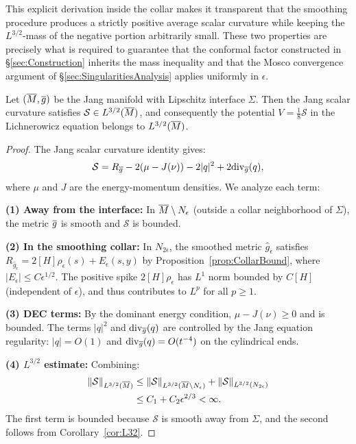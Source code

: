 This explicit derivation inside the collar makes it transparent that the smoothing procedure produces a strictly positive average scalar curvature while keeping the $L^{3/2}$-mass of the negative portion arbitrarily small.  These two properties are precisely what is required to guarantee that the conformal factor constructed in \S\ref{sec:Construction} inherits the mass inequality and that the Mosco convergence argument of \S\ref{sec:SingularitiesAnalysis} applies uniformly in $\epsilon$.

\begin{lemma}\label{lem:MiaoCorner}
Let $(\overline{M}, \overline{g})$ be the Jang manifold with Lipschitz interface $\Sigma$. Then the Jang scalar curvature satisfies $\mathcal{S} \in L^{3/2}(\overline{M})$, and consequently the potential $V = \frac{1}{8}\mathcal{S}$ in the Lichnerowicz equation belongs to $L^{3/2}(\overline{M})$.
\end{lemma}

\begin{proof}
The Jang scalar curvature identity gives:
\begin{equation}
    \mathcal{S} = R_{\overline{g}} - 2(\mu - J(\nu)) - 2|q|^2 + 2\mathrm{div}_{\overline{g}}(q),
\end{equation}
where $\mu$ and $J$ are the energy-momentum densities. We analyze each term:

\textbf{(1) Away from the interface:} In $\overline{M} \setminus N_\epsilon$ (outside a collar neighborhood of $\Sigma$), the metric $\overline{g}$ is smooth and $\mathcal{S}$ is bounded.

\textbf{(2) In the smoothing collar:} In $N_{2\epsilon}$, the smoothed metric $\hat{g}_\epsilon$ satisfies $R_{\hat{g}_\epsilon} = 2[H]\rho_\epsilon(s) + E_\epsilon(s,y)$ by Proposition~\ref{prop:CollarBound}, where $|E_\epsilon| \le C\epsilon^{1/2}$. The positive spike $2[H]\rho_\epsilon$ has $L^1$ norm bounded by $C[H]$ (independent of $\epsilon$), and thus contributes to $L^p$ for all $p \ge 1$.

\textbf{(3) DEC terms:} By the dominant energy condition, $\mu - J(\nu) \ge 0$ and is bounded. The terms $|q|^2$ and $\mathrm{div}_{\overline{g}}(q)$ are controlled by the Jang equation regularity: $|q| = O(1)$ and $\mathrm{div}_{\overline{g}}(q) = O(t^{-4})$ on the cylindrical ends.

\textbf{(4) $L^{3/2}$ estimate:} Combining:
\begin{align}
    \|\mathcal{S}\|_{L^{3/2}(\overline{M})} &\le \|\mathcal{S}\|_{L^{3/2}(\overline{M} \setminus N_\epsilon)} + \|\mathcal{S}\|_{L^{3/2}(N_{2\epsilon})} \\
    &\le C_1 + C_2 \epsilon^{2/3} < \infty.
\end{align}
The first term is bounded because $\mathcal{S}$ is smooth away from $\Sigma$, and the second follows from Corollary~\ref{cor:L32}.
\end{proof}

